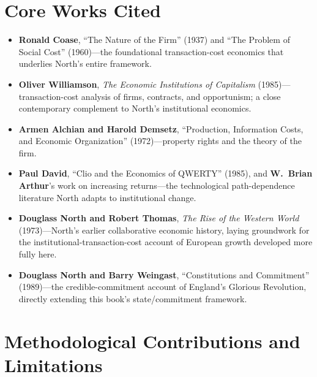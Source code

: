 \documentclass[12pt]{article}
\begin{document}
\section{Core Works Cited}

\begin{itemize}[leftmargin=*, itemsep=4pt]
    \item \textbf{Ronald Coase}, ``The Nature of the Firm'' (1937) and ``The Problem of Social Cost'' (1960)---the foundational transaction-cost economics that underlies North's entire framework.
    \item \textbf{Oliver Williamson}, \textit{The Economic Institutions of Capitalism} (1985)---transaction-cost analysis of firms, contracts, and opportunism; a close contemporary complement to North's institutional economics.
    \item \textbf{Armen Alchian and Harold Demsetz}, ``Production, Information Costs, and Economic Organization'' (1972)---property rights and the theory of the firm.
    \item \textbf{Paul David}, ``Clio and the Economics of QWERTY'' (1985), and \textbf{W.\ Brian Arthur}'s work on increasing returns---the technological path-dependence literature North adapts to institutional change.
    \item \textbf{Douglass North and Robert Thomas}, \textit{The Rise of the Western World} (1973)---North's earlier collaborative economic history, laying groundwork for the institutional-transaction-cost account of European growth developed more fully here.
    \item \textbf{Douglass North and Barry Weingast}, ``Constitutions and Commitment'' (1989)---the credible-commitment account of England's Glorious Revolution, directly extending this book's state/commitment framework.
\end{itemize}

\section{Methodological Contributions and Limitations}
\end{document}
